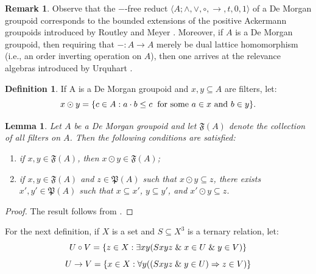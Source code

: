 \documentclass{amsart}
\theoremstyle{plain}
\newtheorem{lemma}[theorem]{Lemma}
\theoremstyle{definition}
\newtheorem{definition}[theorem]{Definition}
\newtheorem{remark}[theorem]{Remark}
\begin{document}
\begin{remark}
 Observe that the $-$-free reduct $\langle A;\wedge,\vee,\circ,\rightarrow,t,0,1\rangle$ of a De Morgan groupoid corresponds to the bounded extensions of the positive Ackermann groupoids introduced by Routley and Meyer \cite{meyer}. Moreover, if $A$ is a De Morgan groupoid, then requiring that $-\colon A\to A$ merely be dual lattice homomorphism (i.e., an order inverting operation on $A$), then one arrives at the relevance algebras introduced by Urquhart \cite{urq}.  
\end{remark}
\begin{definition}\label{definition 4.3}
    If A is a De Morgan groupoid and $x,y\subseteq A$ are filters, let: 
    \[x\odot y=\{c\in A:a\cdot b\leq c\hspace{.2cm}\text{for some $a\in x$ and $b\in y$}\}.\]
\end{definition}
\begin{lemma}\label{lemma 4.3}
    Let $A$ be a De Morgan groupoid and let $\mathfrak{F}(A)$ denote the collection of all filters on $A$. Then the following conditions are satisfied: 
\begin{enumerate}
    \item if $x,y\in\mathfrak{F}(A)$, then $x\odot y\in\mathfrak{F}(A)$;  
    \item if $x,y\in\mathfrak{F}(A)$ and $z\in\mathfrak{P}(A)$ such that $x\odot y\subseteq z$, there exists $x',y'\in\mathfrak{P}(A)$ such that $x\subseteq x'$, $y\subseteq y'$, and $x'\odot y\subseteq z$. 
\end{enumerate}
 \end{lemma}
\begin{proof}
    The result follows from \cite[Lemma 2.1, Lemma 2.2]{urq}. 
\end{proof}




For the next definition, if $X$ is a set and $S\subseteq X^3$ is a ternary relation, let: 
\[U\circ V=\{z\in X:\exists xy(Sxyz\hspace{.1cm}\&\hspace{.1cm} x\in U\hspace{.1cm}\&\hspace{.1cm} y\in V)\}\]
\[U\rightarrow V=\{x\in X:\forall y((Sxyz\hspace{.1cm}\&\hspace{.1cm} y\in U)\Rightarrow z\in V)\}\]
\end{document}
